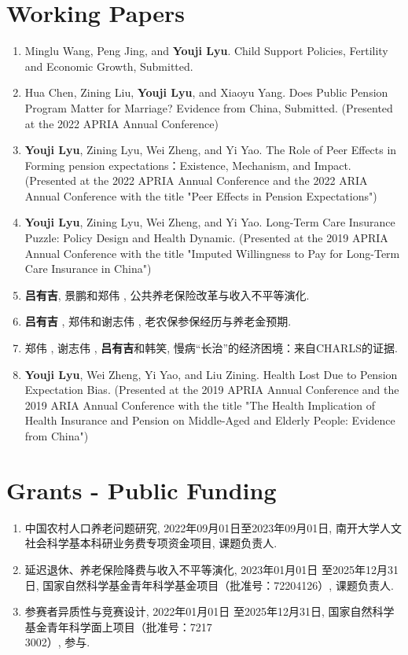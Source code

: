 \documentclass[a4paper,20pt]{article}
\begin{document}
\vspace{-5pt}
\section{Working Papers}
\begin{enumerate}
  \item Minglu Wang, Peng Jing, and \textbf{Youji Lyu}. Child Support Policies, Fertility and Economic Growth, Submitted.
  \item Hua Chen, Zining Liu, \textbf{Youji Lyu}, and Xiaoyu Yang. Does Public Pension Program Matter for Marriage? Evidence from China, Submitted. (Presented at the 2022 APRIA Annual Conference)
  \item \textbf{Youji Lyu}, Zining Lyu, Wei Zheng, and Yi Yao. The Role of Peer Effects in Forming pension expectations：Existence, Mechanism, and Impact. (Presented at the 2022 APRIA Annual Conference and the 2022 ARIA Annual Conference with the title "Peer Effects in Pension Expectations")
  \item \textbf{Youji Lyu}, Zining Lyu, Wei Zheng, and Yi Yao. Long-Term Care Insurance Puzzle: Policy Design and Health Dynamic. (Presented at the 2019 APRIA Annual Conference with the title "Imputed Willingness to Pay for Long-Term Care Insurance in China")
  \item \textbf{吕有吉}, 景鹏和郑伟 , 公共养老保险改革与收入不平等演化.
  \item \textbf{吕有吉 }, 郑伟和谢志伟 , 老农保参保经历与养老金预期.
  \item 郑伟 , 谢志伟 , \textbf{吕有吉}和韩笑, 慢病“长治”的经济困境：来自CHARLS的证据.
  \item \textbf{Youji Lyu}, Wei Zheng, Yi Yao, and Liu Zining. Health Lost Due to Pension Expectation Bias. (Presented at the 2019 APRIA Annual Conference and the 2019 ARIA Annual Conference with the title "The Health Implication of Health Insurance and Pension on Middle-Aged and Elderly People: Evidence from China")
\end{enumerate}

\vspace{-5pt}
\section{Grants - Public Funding}
\begin{enumerate}
  \item 中国农村人口养老问题研究, 2022年09月01日至2023年09月01日, 南开大学人文社会科学基本科研业务费专项资金项目, 课题负责人.
  \item 延迟退休、养老保险降费与收入不平等演化, 2023年01月01日 至2025年12月31日, 国家自然科学基金青年科学基金项目（批准号：72204126）, 课题负责人.
  \item 参赛者异质性与竞赛设计, 2022年01月01日 至2025年12月31日, 国家自然科学基金青年科学面上项目（批准号：7217\\3002）, 参与.
\end{enumerate}
\end{document}
